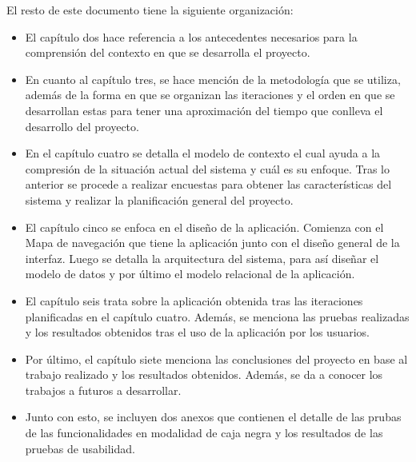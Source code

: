 El resto de este documento tiene la siguiente organización:

\begin{itemize}
    \item El capítulo dos hace referencia a los antecedentes necesarios para la comprensión del contexto en que se desarrolla el proyecto.
    \item En cuanto al capítulo tres, se hace mención de la metodología que se utiliza, además de la forma en que se organizan las iteraciones y el orden en que se desarrollan estas para tener una aproximación del tiempo que conlleva el desarrollo del proyecto.
    \item En el capítulo cuatro se detalla el modelo de contexto el cual ayuda a la compresión de la situación actual del sistema y cuál es su enfoque. Tras lo anterior se procede a realizar encuestas para obtener las características del sistema y realizar la planificación general del proyecto.
    \item El capítulo cinco se enfoca en el diseño de la aplicación. Comienza con el Mapa de navegación que tiene la aplicación junto con el diseño general de la interfaz. Luego se detalla la arquitectura del sistema, para así diseñar el modelo de datos y por último el modelo relacional de la aplicación.
    \item El capítulo seis trata sobre la aplicación obtenida tras las iteraciones planificadas en el capítulo cuatro. Además, se menciona las pruebas realizadas y los resultados obtenidos tras el uso de la aplicación por los usuarios.
    \item Por último, el capítulo siete menciona las conclusiones del proyecto en base al trabajo realizado y los resultados obtenidos. Además, se da a conocer los trabajos a futuros a desarrollar.
    \item Junto con esto, se incluyen dos anexos que contienen el detalle de las prubas de las funcionalidades en modalidad de caja negra y los resultados de las pruebas de usabilidad.
\end{itemize}
